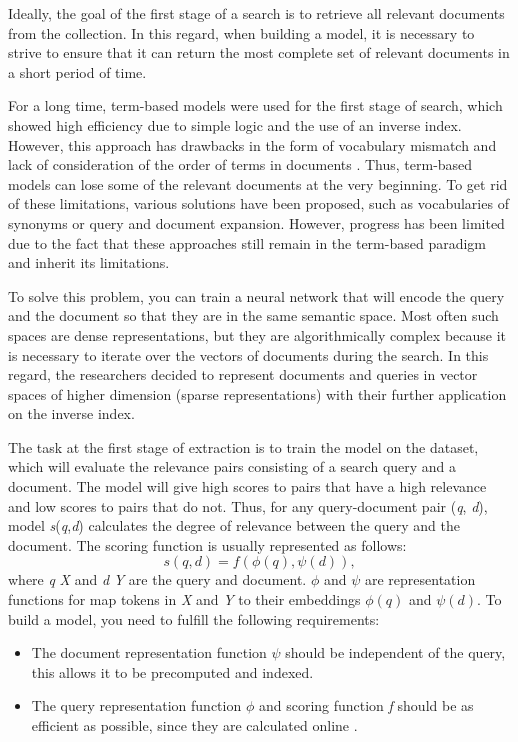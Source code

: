 \documentclass[
    twocolumn,
]{ceurart}
\begin{document}
    Ideally, the goal of the first stage of a search is to retrieve all relevant documents from the
    collection.
    In this regard, when building a model, it is necessary to strive to ensure that it can return
    the most complete set of relevant documents in a short period of time.

    For a long time, term-based models were used for the first stage of search, which showed high
    efficiency \cite{termBasedModelEfficiency1, termBasedModelEfficiency2} due to simple logic
    and the use of an inverse index.
    However, this approach has drawbacks in the form of vocabulary mismatch
    \cite{vocabularyMismatch1, vocabularyMismatch2} and lack of consideration of the order of
    terms in documents \cite{ignoringTermOrdering}.
    Thus, term-based models can lose some of the relevant documents at the very beginning.
    To get rid of these limitations, various solutions have been proposed, such as vocabularies
    of synonyms or query \cite{queryExp1,queryExp2,queryExp3,queryExp4} and document
    \cite{docExp1, docExp2, docExp3} expansion.
    However, progress has been limited due to the fact that these approaches still remain in
    the term-based paradigm and inherit its limitations.

    To solve this problem, you can train a neural network that will encode the query and the
    document so that they are in the same semantic space. Most often such spaces are dense
    representations, but they are algorithmically complex because it is necessary to iterate over
    the vectors of documents during the search. In this regard, the researchers decided to
    represent documents and queries in vector spaces of higher dimension (sparse representations)
    with their further application on the inverse index.

    The task at the first stage of extraction is to train the model on the dataset, which will
    evaluate the relevance pairs consisting of a search query and a document.
    The model will give high scores to pairs that have a high relevance and low scores to
    pairs that do not.
    Thus, for any query-document pair (\emph{q}, \emph{d}), model \emph{s}(\emph{q},\emph{d})
    calculates the degree of relevance between the query and the document.
    The scoring function is usually represented as follows:
    \begin{equation}
        s(q,d) = f(\phi(q), \psi(d)),
    \end{equation}
    where \emph{q} \in \emph{X} and \emph{d} \in \emph{Y} are the query and document. $\phi$ and
    $\psi$ are representation functions for map tokens in \emph{X} and \emph{Y} to their
    embeddings $\phi(q)$ and $\psi(d)$.
    To build a model, you need to fulfill the following requirements:
    \begin{itemize}
        \item The document representation function $\psi$ should be independent of the query,
        this allows it to be precomputed and indexed.
        \item The query representation function $\phi$ and scoring function \emph{f} should be as
        efficient as possible, since they are calculated online \cite{SOTA}.
    \end{itemize}
\end{document}
